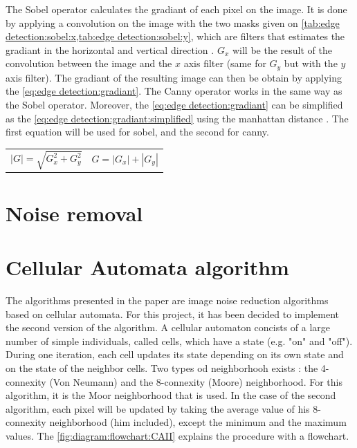 


The Sobel operator calculates the gradiant of each pixel on the image. It is done by applying a convolution on the image with the two masks given on \vref{tab:edge detection:sobel:x,tab:edge detection:sobel:y}, which are filters that estimates the gradiant in the horizontal and vertical direction  \cite{bib:filter:sobelRuby}. $G_x$ will be the result of the convolution between the image and the $x$ axis filter (same for $G_y$ but with the $y$ axis filter). The gradiant of the resulting image can then be obtain by applying the \vref{eq:edge detection:gradiant}. The Canny operator works in the same way as the Sobel operator. Moreover, the \vref{eq:edge detection:gradiant} can be simplified as the \vref{eq:edge detection:gradiant:simplified} using the manhattan distance \cite{bib:filter:canny}. The first equation will be used for sobel, and the second for canny. 


\noindent\begin{tabularx}{\textwidth}{@{}XX@{}}
	\begin{equation} \label{eq:edge detection:gradiant}
		|G| = \sqrt{G_{x}^2 + G_{y}^2}
	\end{equation} & 
	\begin{equation} \label{eq:edge detection:gradiant:simplified}
		G = |G_x| + |G_y|
	\end{equation}
\end{tabularx}



\section{Noise removal}





\section{Cellular Automata algorithm}

The algorithms presented in the paper \cite{bib:filter:CA} are image noise reduction algorithms based on cellular automata. For this project, it has been decided to implement the second version of the algorithm. A cellular automaton concists of a large number of simple individuals, called cells, which have a state (e.g. "on" and "off"). During one iteration, each cell updates its state depending on its own state and on the state of the neighbor cells. Two types od neighborhooh exists : the 4-connexity (Von Neumann) and the 8-connexity (Moore) neighborhood. For this algorithm, it is the Moor neighborhood that is used. In the case of the second algorithm, each pixel will be updated by taking the average value of his 8-connexity neighborhood (him included), except the minimum and the maximum values. The \vref{fig:diagram:flowchart:CAII} explains the procedure with a flowchart.


